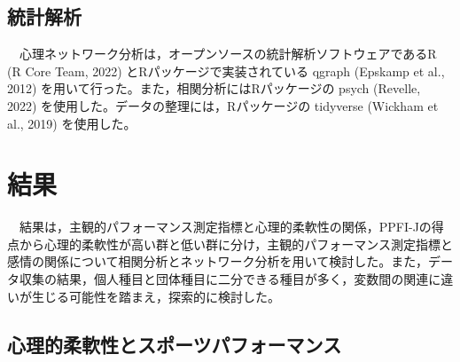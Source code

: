 \documentclass[12pt,a4paper,xelatex,ja=standard]{bxjsarticle}
\begin{document}
\hypertarget{ux7d71ux8a08ux89e3ux6790}{%
\subsection{統計解析}\label{ux7d71ux8a08ux89e3ux6790}}

　心理ネットワーク分析は，オープンソースの統計解析ソフトウェアであるR (R
Core Team, 2022) とRパッケージで実装されている qgraph (Epskamp et al.,
2012) を用いて行った。また，相関分析にはRパッケージの psych (Revelle,
2022) を使用した。データの整理には，Rパッケージの tidyverse (Wickham et
al., 2019) を使用した。

\clearpage

\hypertarget{ux7d50ux679c}{%
\section{結果}\label{ux7d50ux679c}}

　結果は，主観的パフォーマンス測定指標と心理的柔軟性の関係，PPFI-Jの得点から心理的柔軟性が高い群と低い群に分け，主観的パフォーマンス測定指標と感情の関係について相関分析とネットワーク分析を用いて検討した。また，データ収集の結果，個人種目と団体種目に二分できる種目が多く，変数間の関連に違いが生じる可能性を踏まえ，探索的に検討した。

\hypertarget{ux5fc3ux7406ux7684ux67d4ux8edfux6027ux3068ux30b9ux30ddux30fcux30c4ux30d1ux30d5ux30a9ux30fcux30deux30f3ux30b9}{%
\subsection{心理的柔軟性とスポーツパフォーマンス}\label{ux5fc3ux7406ux7684ux67d4ux8edfux6027ux3068ux30b9ux30ddux30fcux30c4ux30d1ux30d5ux30a9ux30fcux30deux30f3ux30b9}}
\end{document}
